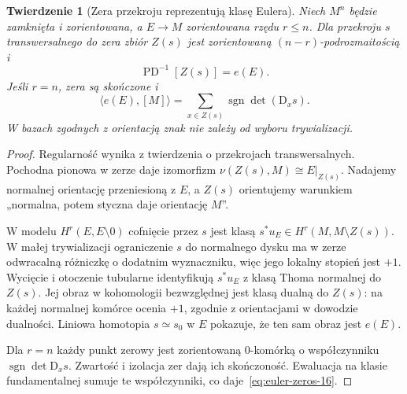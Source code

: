 \documentclass[11pt,a4paper,oneside]{report}
\newcommand{\D}{\mathrm D}
\theoremstyle{plain}
\newtheorem{twierdzenie}{Twierdzenie}[section]
\theoremstyle{definition}
\theoremstyle{remark}
\begin{document}
\begin{twierdzenie}[Zera przekroju reprezentują klasę Eulera]
\label{thm:euler-zeros-16}
Niech $M^n$ będzie
zamknięta i zorientowana,
a $E\to M$ zorientowana
rzędu $r\leq n$.
Dla przekroju $s$
transwersalnego do zera
zbiór $Z(s)$ jest
zorientowaną
$(n-r)$-podrozmaitością i
\[
 \operatorname{PD}^{-1}[Z(s)]=e(E).
\]
Jeśli $r=n$, zera są
skończone i
\begin{equation}\label{eq:euler-zeros-16}
 \langle e(E),[M]\rangle
   =\sum_{x\in Z(s)}
       \operatorname{sgn}\det(\D_xs).
\end{equation}
W bazach zgodnych z
orientacją znak nie
zależy od wyboru
trywializacji.
\end{twierdzenie}
\begin{proof}
Regularność wynika z twierdzenia o przekrojach transwersalnych.
Pochodna pionowa w zerze daje izomorfizm
$\nu(Z(s),M)\cong E|_{Z(s)}$. Nadajemy normalnej
orientację przeniesioną z $E$, a $Z(s)$ orientujemy
warunkiem „normalna, potem styczna daje orientację $M$”.

W modelu $H^r(E,E\setminus0)$ cofnięcie przez $s$
jest klasą $s^*u_E\in H^r(M,M\setminus Z(s))$.
W małej trywializacji ograniczenie $s$ do normalnego
dysku ma w zerze odwracalną różniczkę o dodatnim
wyznaczniku, więc jego lokalny stopień jest $+1$.
Wycięcie i otoczenie tubularne identyfikują
$s^*u_E$ z klasą Thoma normalnej do $Z(s)$.
Jej obraz w kohomologii bezwzględnej jest klasą
dualną do $Z(s)$: na każdej normalnej komórce
ocenia $+1$, zgodnie z orientacjami w dowodzie dualności.
Liniowa homotopia $s\simeq s_0$ w $E$ pokazuje,
że ten sam obraz jest $e(E)$.

Dla $r=n$ każdy punkt zerowy jest zorientowaną
$0$-komórką o współczynniku
$\operatorname{sgn}\det\D_xs$. Zwartość i izolacja
zer dają ich skończoność. Ewaluacja na klasie
fundamentalnej sumuje te współczynniki,
co daje~\eqref{eq:euler-zeros-16}.
\end{proof}
\end{document}
